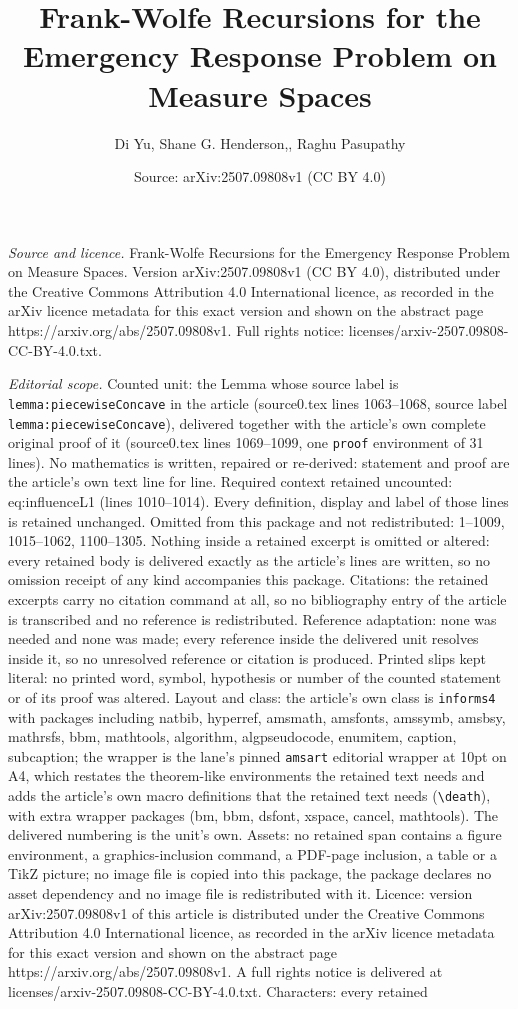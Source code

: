 \documentclass[10pt,a4paper]{amsart}
\title[Frank-Wolfe Recursions for the Emergency Response Problem on]{Frank-Wolfe Recursions for the Emergency Response Problem on Measure Spaces}
\author{Di Yu, Shane G. Henderson,, Raghu Pasupathy}
\date{Source: arXiv:2507.09808v1 (CC BY 4.0)}
\begin{document}
\maketitle

\noindent\emph{Source and licence.} Frank-Wolfe Recursions for the Emergency Response Problem on Measure Spaces. Version arXiv:2507.09808v1 (CC BY 4.0), distributed under the Creative Commons Attribution 4.0 International licence, as recorded in the arXiv licence metadata for this exact version and shown on the abstract page https://arxiv.org/abs/2507.09808v1. Full rights notice: licenses/arxiv-2507.09808-CC-BY-4.0.txt.\par\smallskip

\noindent\textit{Editorial scope.} Counted unit: the Lemma whose source label is \texttt{lemma:piecewiseConcave} in the article (source0.tex lines 1063--1068, source label \texttt{lemma:piecewiseConcave}), delivered together with the article's own complete original proof of it (source0.tex lines 1069--1099, one \texttt{proof} environment of 31 lines). No mathematics is written, repaired or re-derived: statement and proof are the article's own text line for line. Required context retained uncounted: eq:influenceL1 (lines 1010--1014). Every definition, display and label of those lines is retained unchanged. Omitted from this package and not redistributed: 1--1009, 1015--1062, 1100--1305. Nothing inside a retained excerpt is omitted or altered: every retained body is delivered exactly as the article's lines are written, so no omission receipt of any kind accompanies this package. Citations: the retained excerpts carry no citation command at all, so no bibliography entry of the article is transcribed and no reference is redistributed. Reference adaptation: none was needed and none was made; every reference inside the delivered unit resolves inside it, so no unresolved reference or citation is produced. Printed slips kept literal: no printed word, symbol, hypothesis or number of the counted statement or of its proof was altered. Layout and class: the article's own class is \texttt{informs4} with packages including natbib, hyperref, amsmath, amsfonts, amssymb, amsbsy, mathrsfs, bbm, mathtools, algorithm, algpseudocode, enumitem, caption, subcaption; the wrapper is the lane's pinned \texttt{amsart} editorial wrapper at 10pt on A4, which restates the theorem-like environments the retained text needs and adds the article's own macro definitions that the retained text needs (\texttt{\textbackslash death}), with extra wrapper packages (bm, bbm, dsfont, xspace, cancel, mathtools). The delivered numbering is the unit's own. Assets: no retained span contains a figure environment, a graphics-inclusion command, a PDF-page inclusion, a table or a TikZ picture; no image file is copied into this package, the package declares no asset dependency and no image file is redistributed with it. Licence: version arXiv:2507.09808v1 of this article is distributed under the Creative Commons Attribution 4.0 International licence, as recorded in the arXiv licence metadata for this exact version and shown on the abstract page https://arxiv.org/abs/2507.09808v1. A full rights notice is delivered at licenses/arxiv-2507.09808-CC-BY-4.0.txt. Characters: every retained 
\end{document}
